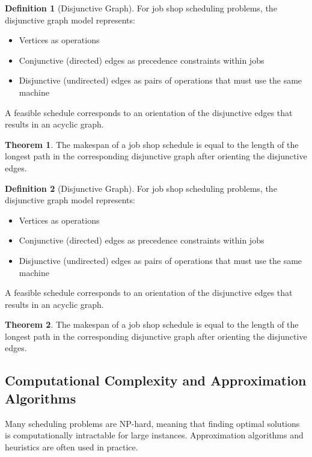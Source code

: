 \documentclass{article}
\theoremstyle{definition}
\newtheorem{theorem}{Theorem}
\newtheorem{definition}{Definition}
\begin{document}
\begin{definition}[Disjunctive Graph]
For job shop scheduling problems, the disjunctive graph model represents:
\begin{itemize}
    \item Vertices as operations
    \item Conjunctive (directed) edges as precedence constraints within jobs
    \item Disjunctive (undirected) edges as pairs of operations that must use the same machine
\end{itemize}
A feasible schedule corresponds to an orientation of the disjunctive edges that results in an acyclic graph.
\end{definition}

\begin{theorem}
The makespan of a job shop schedule is equal to the length of the longest path in the corresponding disjunctive graph after orienting the disjunctive edges.
\end{theorem}

\begin{definition}[Disjunctive Graph]
For job shop scheduling problems, the disjunctive graph model represents:
\begin{itemize}
    \item Vertices as operations
    \item Conjunctive (directed) edges as precedence constraints within jobs
    \item Disjunctive (undirected) edges as pairs of operations that must use the same machine
\end{itemize}
A feasible schedule corresponds to an orientation of the disjunctive edges that results in an acyclic graph.
\end{definition}

\begin{theorem}
The makespan of a job shop schedule is equal to the length of the longest path in the corresponding disjunctive graph after orienting the disjunctive edges.
\end{theorem}

\subsection*{Computational Complexity and Approximation Algorithms}

Many scheduling problems are NP-hard, meaning that finding optimal solutions is computationally intractable for large instances. Approximation algorithms and heuristics are often used in practice.
\end{document}
